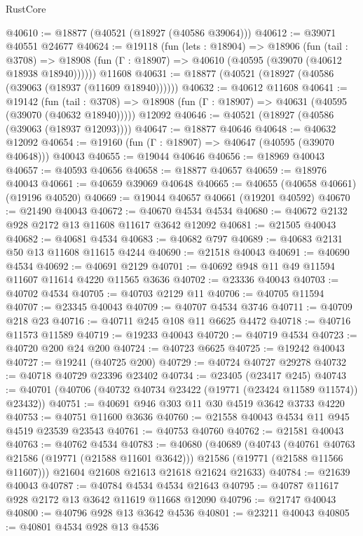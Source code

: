 \begin{lexlean}{RustCore}
\begin{coremodule}
@40610 := @18877 (@40521 (@18927 (@40586 @39064)))
@40612 := @39071 @40551 @24677
@40624 := @19118
    (fun (lets : @18904) =>
    @18906
      (fun (tail : @3708) =>
      @18908 (fun (Γ : @18907) => @40610 (@40595 (@39070 (@40612 @18938 @18940))))))
    @11608
@40631 := @18877 (@40521 (@18927 (@40586 (@39063 (@18937 (@11609 @18940))))))
@40632 := @40612 @11608
@40641 := @19142
    (fun (tail : @3708) => @18908 (fun (Γ : @18907) => @40631 (@40595 (@39070 (@40632 @18940)))))
    @12092
@40646 := @40521 (@18927 (@40586 (@39063 (@18937 @12093))))
@40647 := @18877 @40646
@40648 := @40632 @12092
@40654 := @19160 (fun (Γ : @18907) => @40647 (@40595 (@39070 @40648))) @40043
@40655 := @19044 @40646
@40656 := @18969 @40043
@40657 := @40593 @40656
@40658 := @18877 @40657
@40659 := @18976 @40043
@40661 := @40659 @39069 @40648
@40665 := @40655 (@40658 @40661) (@19196 @40520)
@40669 := @19044 @40657 @40661 (@19201 @40592)
@40670 := @21490 @40043
@40672 := @40670 @4534 @4534
@40680 := @40672 @2132 @928 @2172 @13 @11608 @11617 @3642 @12092
@40681 := @21505 @40043
@40682 := @40681 @4534
@40683 := @40682 @797
@40689 := @40683 @2131 @50 @13 @11608 @11615 @4244
@40690 := @21518 @40043
@40691 := @40690 @4534
@40692 := @40691 @2129
@40701 := @40692 @948 @11 @49 @11594 @11607 @11614 @4220 @11565 @3636
@40702 := @23336 @40043
@40703 := @40702 @4534
@40705 := @40703 @2129 @11
@40706 := @40705 @11594
@40707 := @23345 @40043
@40709 := @40707 @4534 @3746
@40711 := @40709 @218 @23
@40716 := @40711 @245 @108 @11 @6625 @4472
@40718 := @40716 @11573 @11589
@40719 := @19233 @40043
@40720 := @40719 @4534
@40723 := @40720 @200 @24 @200
@40724 := @40723 @6625
@40725 := @19242 @40043
@40727 := @19241 (@40725 @200)
@40729 := @40724 @40727 @29278
@40732 := @40718 @40729 @23396 @23402
@40734 := @23405 (@23417 @245)
@40743 := @40701 (@40706 (@40732 @40734 @23422 (@19771 (@23424 @11589 @11574)) @23432))
@40751 := @40691 @946 @303 @11 @30 @4519 @3642 @3733 @4220
@40753 := @40751 @11600 @3636
@40760 := @21558 @40043 @4534 @11 @945 @4519 @23539 @23543
@40761 := @40753 @40760
@40762 := @21581 @40043
@40763 := @40762 @4534
@40783 := @40680
    (@40689
      (@40743
        (@40761 @40763 @21586 (@19771 (@21588 @11601 @3642)))
        @21586
        (@19771 (@21588 @11566 @11607)))
      @21604
      @21608
      @21613
      @21618
      @21624
      @21633)
@40784 := @21639 @40043
@40787 := @40784 @4534 @4534 @21643
@40795 := @40787 @11617 @928 @2172 @13 @3642 @11619 @11668 @12090
@40796 := @21747 @40043
@40800 := @40796 @928 @13 @3642 @4536
@40801 := @23211 @40043
@40805 := @40801 @4534 @928 @13 @4536

\end{coremodule}
\end{lexlean}
